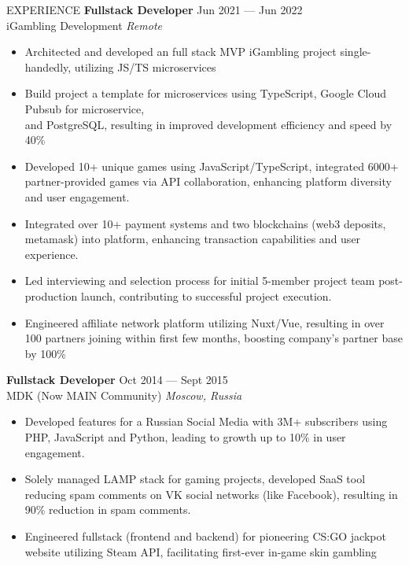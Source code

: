 \documentclass{template} %
\begin{document}
\begin{rSection}{EXPERIENCE}
\textbf{Fullstack Developer} \hfill Jun 2021 --- Jun 2022\\
iGambling Development \hfill \textit{Remote}
 \begin{itemize}
    \itemsep -3pt {} 
     \item Architected and developed an full stack MVP iGambling project single-handedly, utilizing JS/TS microservices
     \item Build project a template for microservices using TypeScript, Google Cloud Pubsub for microservice,\\and PostgreSQL, resulting in improved development efficiency and speed by 40\%
     \item Developed 10+ unique games using JavaScript/TypeScript, integrated 6000+ partner-provided games via API collaboration, enhancing platform diversity and user engagement.
     \item Integrated over 10+ payment systems and two blockchains (web3 deposits, metamask) into platform, enhancing transaction capabilities and user experience.
     \item Led interviewing and selection process for initial 5-member project team post-production launch, contributing to successful project execution.
     \item Engineered affiliate network platform utilizing Nuxt/Vue, resulting in over 100 partners joining within first few months, boosting company's partner base by 100\%
 \end{itemize}
\pagebreak
 \textbf{Fullstack Developer} \hfill Oct 2014 --- Sept 2015\\
MDK (Now MAIN Community) \hfill \textit{Moscow, Russia}
 \begin{itemize}
    \itemsep -3pt {} 
     \item Developed features for a Russian Social Media with 3M+ subscribers using PHP, JavaScript and Python, leading to growth up to 10\% in user engagement.
     \item Solely managed LAMP stack for gaming projects, developed SaaS tool reducing spam comments on VK social networks (like Facebook), resulting in 90\% reduction in spam comments.
     \item Engineered fullstack (frontend and backend) for pioneering CS:GO jackpot website utilizing Steam API, facilitating first-ever in-game skin gambling
 \end{itemize}


\end{rSection}
\end{document}
